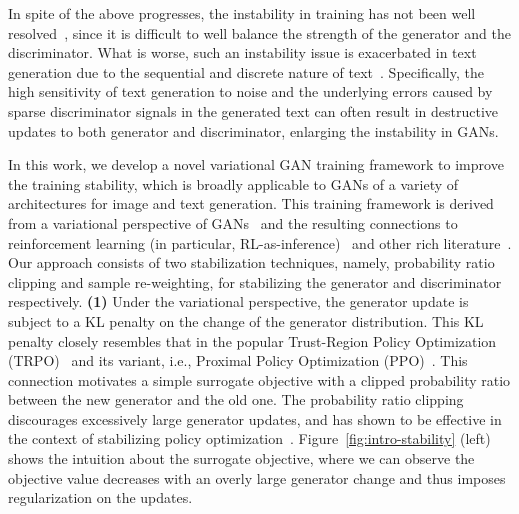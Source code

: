 \documentclass{article}
\newcommand{\0}{\bm{0}}
\begin{document}
In spite of the above progresses, the instability in training has not been well resolved~\cite{chu2020smoothness}, since it is difficult to well balance the strength of the generator and the discriminator. What is worse, such an instability issue is exacerbated in text generation due to the sequential and discrete nature of text~\cite{fedus2018maskgan,caccia2018language,hu2017toward}. Specifically, the high sensitivity of text generation to noise and the underlying errors caused by sparse discriminator signals in the generated text can often result in destructive updates to both generator and discriminator, enlarging the instability in GANs.  




 


In this work, we develop a novel variational GAN training framework to improve the training stability, which is broadly applicable to GANs of a variety of architectures for image and text generation. This training framework is derived from a variational perspective of GANs~\citep{hu2018deep} and the resulting connections to reinforcement learning (in particular, RL-as-inference)~\cite{abdolmaleki2018maximum,PPO} and other rich literature~\cite{grover2019bias,hu2017unifying,burda2015importance}. 
Our approach consists of two stabilization techniques, namely, probability ratio clipping and sample re-weighting, for stabilizing the generator and  discriminator respectively.
{\bf (1)} Under the variational perspective, the generator update is subject to a KL penalty on the change of the generator distribution. This KL  penalty closely resembles that in the popular Trust-Region Policy Optimization (TRPO)~\cite{TRPO} and its variant, i.e., Proximal Policy Optimization (PPO)~\cite{PPO}. This connection motivates a simple surrogate objective with a clipped probability ratio between the new generator and the old one. 
The probability ratio clipping discourages excessively large generator updates, and has shown to be effective in the context of stabilizing policy optimization~\cite{PPO}. Figure~\ref{fig:intro-stability} (left) shows the intuition about the surrogate objective, where we can observe the objective value decreases with an overly large generator change and thus imposes regularization on the updates.
\end{document}
